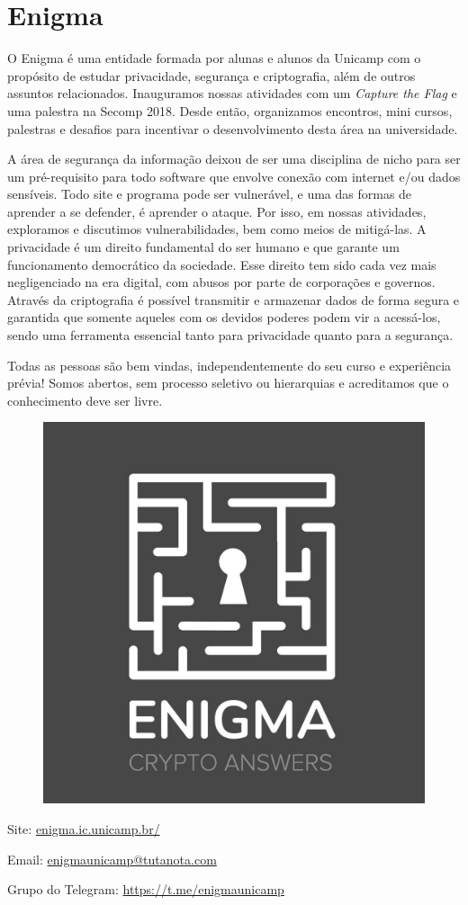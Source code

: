 
\section{Enigma}

O Enigma é uma entidade formada por alunas e alunos da Unicamp com o propósito
de estudar privacidade, segurança e criptografia, além de outros assuntos
relacionados. Inauguramos nossas atividades com um \textit{Capture the Flag} e
uma palestra na Secomp 2018. Desde então, organizamos encontros, mini cursos,
palestras e desafios para incentivar o desenvolvimento desta área na
universidade.

A área de segurança da informação deixou de ser uma disciplina de nicho para
ser um pré-requisito para todo software que envolve conexão com internet e/ou
dados sensíveis. Todo site e programa pode ser vulnerável, e uma das formas de
aprender a se defender, é aprender o ataque. Por isso, em nossas atividades,
exploramos e discutimos vulnerabilidades, bem como meios de mitigá-las. A
privacidade é um direito fundamental do ser humano e que garante um
funcionamento democrático da sociedade. Esse direito tem sido cada vez mais
negligenciado na era digital, com abusos por parte de corporações e governos.
Através da criptografia é possível transmitir e armazenar dados de forma
segura e garantida que somente aqueles com os devidos poderes podem vir a
acessá-los, sendo uma ferramenta essencial tanto para privacidade quanto para a
segurança.

Todas as pessoas são bem vindas, independentemente do seu curso e experiência
prévia! Somos abertos, sem processo seletivo ou hierarquias e acreditamos que
o conhecimento deve ser livre.

\begin{figure}[H]
  \centering
  \includegraphics[width=.24\textwidth]
  {img/alem_da_graduacao/enigma_logo.jpg}
\end{figure}


\begin{compactitemize}
\item Site: \url{enigma.ic.unicamp.br/}
\item Email: \url{enigmaunicamp@tutanota.com}
\item Grupo do Telegram: \url{https://t.me/enigmaunicamp}
\end{compactitemize}
